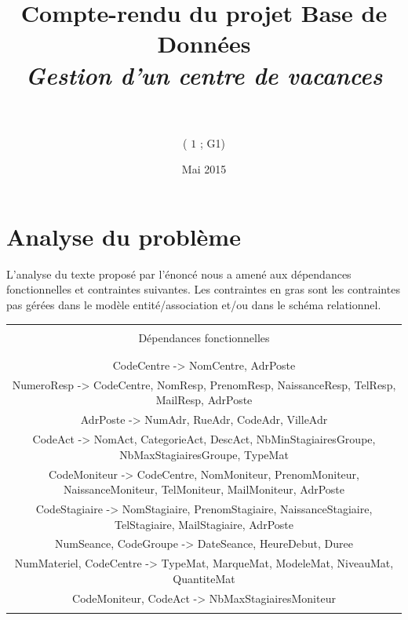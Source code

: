 \documentclass[10pt]{article}
\title{Compte-rendu du projet Base de Données\\ \emph{Gestion d'un centre de vacances}}
\author{\bsc{Garcia Maxime - Ghorreshi Omid}\\ \bsc{Havet Corentin - Portelenelle Brice} \\(\bsc{Teide} $1$ ; \bsc{TD} G1)}
\date{Mai 2015}
\begin{document}
\maketitle

\tableofcontents

\newpage
\section{Analyse du problème}

L'analyse du texte proposé par l'énoncé nous a amené aux dépendances fonctionnelles et contraintes suivantes. Les contraintes en gras sont les contraintes pas gérées dans le modèle entité/association et/ou dans le schéma relationnel.\\

\begin{small}
\begin{tabular}{|c|}

\hline
\\Dépendances fonctionnelles\\ \\
\hline

\\CodeCentre -> NomCentre, AdrPoste\\

NumeroResp -> CodeCentre, NomResp, PrenomResp, NaissanceResp, TelResp, MailResp, AdrPoste\\

AdrPoste -> NumAdr, RueAdr, CodeAdr, VilleAdr\\

CodeAct -> NomAct, CategorieAct, DescAct, NbMinStagiairesGroupe, NbMaxStagiairesGroupe, TypeMat\\

CodeMoniteur -> CodeCentre, NomMoniteur, PrenomMoniteur, NaissanceMoniteur, TelMoniteur, MailMoniteur, AdrPoste\\

CodeStagiaire -> NomStagiaire, PrenomStagiaire, NaissanceStagiaire, TelStagiaire, MailStagiaire, AdrPoste\\

NumSeance, CodeGroupe -> DateSeance, HeureDebut, Duree\\

NumMateriel, CodeCentre -> TypeMat, MarqueMat, ModeleMat, NiveauMat, QuantiteMat\\

CodeMoniteur, CodeAct -> NbMaxStagiairesMoniteur\\ \\


\end{tabular}
\end{small}
\end{document}

